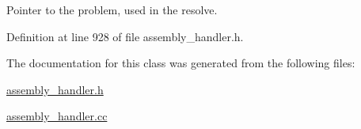 Pointer to the problem, used in the resolve. 



Definition at line 928 of file assembly\+\_\+handler.\+h.



The documentation for this class was generated from the following files\+:\begin{DoxyCompactItemize}
\item 
\hyperlink{assembly__handler_8h}{assembly\+\_\+handler.\+h}\item 
\hyperlink{assembly__handler_8cc}{assembly\+\_\+handler.\+cc}\end{DoxyCompactItemize}
